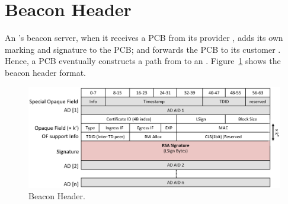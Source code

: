 \section{Beacon Header}
An \AD's beacon server, when it receives a PCB from its provider \AD, adds its own marking and signature to the PCB; and forwards the PCB to its customer \AD. Hence, a PCB eventually constructs a path from \ISDC to an \STUB \AD. Figure~\ref{fig:hdr-beacon} shows the beacon header format.

\begin{figure}[ht]
\centering
\includegraphics[width=.9\columnwidth]{./fig/nhdr_pcb.eps}
\caption{Beacon Header.}\label{fig:hdr-beacon}
\end{figure}

